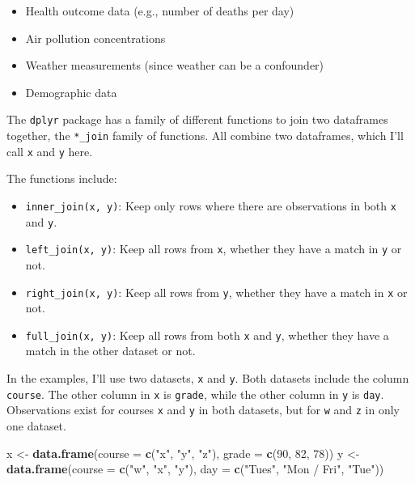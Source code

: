 \documentclass[]{book}
\makeatletter
\newenvironment{Shaded}{\begin{snugshade}}{\end{snugshade}}
\newcommand{\KeywordTok}[1]{\textcolor[rgb]{0.13,0.29,0.53}{\textbf{#1}}}
\newcommand{\DataTypeTok}[1]{\textcolor[rgb]{0.13,0.29,0.53}{#1}}
\newcommand{\DecValTok}[1]{\textcolor[rgb]{0.00,0.00,0.81}{#1}}
\newcommand{\StringTok}[1]{\textcolor[rgb]{0.31,0.60,0.02}{#1}}
\newcommand{\NormalTok}[1]{#1}
\providecommand{\tightlist}{%
  \setlength{\itemsep}{0pt}\setlength{\parskip}{0pt}}
\newenvironment{kframe}{%
\medskip{}
\setlength{\fboxsep}{.8em}
 \def\at@end@of@kframe{}%
 \ifinner\ifhmode%
  \def\at@end@of@kframe{\end{minipage}}%
  \begin{minipage}{\columnwidth}%
 \fi\fi%
 \def\FrameCommand##1{\hskip\@totalleftmargin \hskip-\fboxsep
 \colorbox{shadecolor}{##1}\hskip-\fboxsep
     \hskip-\linewidth \hskip-\@totalleftmargin \hskip\columnwidth}%
 \MakeFramed {\advance\hsize-\width
   \@totalleftmargin\z@ \linewidth\hsize
   \@setminipage}}%
 {\par\unskip\endMakeFramed%
 \at@end@of@kframe}
\renewenvironment{Shaded}{\begin{kframe}}{\end{kframe}}
\theoremstyle{definition}
\theoremstyle{definition}
\theoremstyle{definition}
\theoremstyle{remark}
\makeatother
\begin{document}
\begin{itemize}
\tightlist
\item
  Health outcome data (e.g., number of deaths per day)
\item
  Air pollution concentrations
\item
  Weather measurements (since weather can be a confounder)
\item
  Demographic data
\end{itemize}

The \texttt{dplyr} package has a family of different functions to join
two dataframes together, the \texttt{*\_join} family of functions. All
combine two dataframes, which I'll call \texttt{x} and \texttt{y} here.
\medskip

The functions include:

\begin{itemize}
\tightlist
\item
  \texttt{inner\_join(x,\ y)}: Keep only rows where there are
  observations in both \texttt{x} and \texttt{y}.
\item
  \texttt{left\_join(x,\ y)}: Keep all rows from \texttt{x}, whether
  they have a match in \texttt{y} or not.
\item
  \texttt{right\_join(x,\ y)}: Keep all rows from \texttt{y}, whether
  they have a match in \texttt{x} or not.
\item
  \texttt{full\_join(x,\ y)}: Keep all rows from both \texttt{x} and
  \texttt{y}, whether they have a match in the other dataset or not.
\end{itemize}

In the examples, I'll use two datasets, \texttt{x} and \texttt{y}. Both
datasets include the column \texttt{course}. The other column in
\texttt{x} is \texttt{grade}, while the other column in \texttt{y} is
\texttt{day}. Observations exist for courses \texttt{x} and \texttt{y}
in both datasets, but for \texttt{w} and \texttt{z} in only one dataset.

\begin{Shaded}
\begin{Highlighting}[]
\NormalTok{x <-}\StringTok{ }\KeywordTok{data.frame}\NormalTok{(}\DataTypeTok{course =} \KeywordTok{c}\NormalTok{(}\StringTok{"x"}\NormalTok{, }\StringTok{"y"}\NormalTok{, }\StringTok{"z"}\NormalTok{),}
                \DataTypeTok{grade =} \KeywordTok{c}\NormalTok{(}\DecValTok{90}\NormalTok{, }\DecValTok{82}\NormalTok{, }\DecValTok{78}\NormalTok{))}
\NormalTok{y <-}\StringTok{ }\KeywordTok{data.frame}\NormalTok{(}\DataTypeTok{course =} \KeywordTok{c}\NormalTok{(}\StringTok{"w"}\NormalTok{, }\StringTok{"x"}\NormalTok{, }\StringTok{"y"}\NormalTok{),}
                \DataTypeTok{day =} \KeywordTok{c}\NormalTok{(}\StringTok{"Tues"}\NormalTok{, }\StringTok{"Mon / Fri"}\NormalTok{, }\StringTok{"Tue"}\NormalTok{))}
\end{Highlighting}
\end{Shaded}
\end{document}
